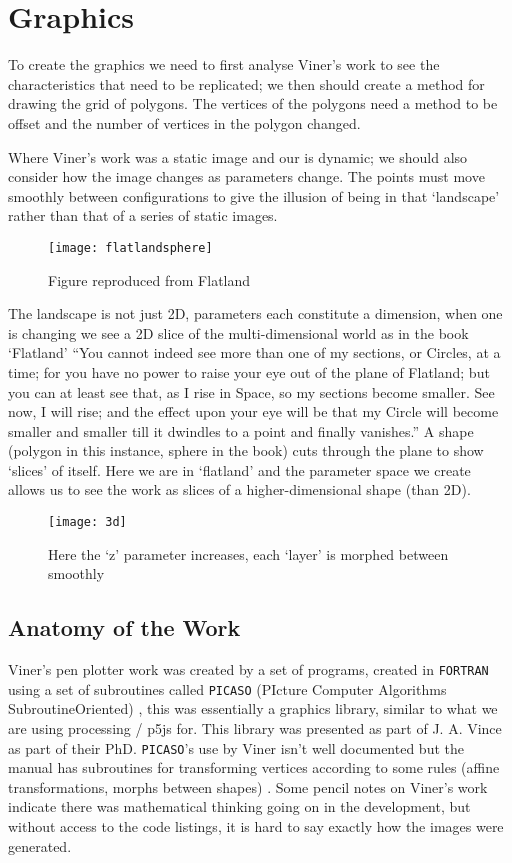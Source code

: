 \chapter{Graphics}
To create the graphics we need to first analyse Viner's work to see the
characteristics that need to be replicated; we then should create a method for
drawing the grid of polygons. The vertices of the polygons need a method to be
offset and the number of vertices in the polygon changed.

Where Viner's work was a static image and our is dynamic; we should also
consider how the image changes as parameters change. The points must move
smoothly between configurations to give the illusion of being in that
`landscape' rather than that of a series of static images.

\begin{figure}[H]
    \centering
    \texttt{[image: flatlandsphere]}
    \caption{Figure reproduced from Flatland \citep[p.112]{abbott1885flatland}}
\end{figure}

The landscape is not just 2D, parameters each constitute a dimension, when one
is changing we see a 2D slice of the multi-dimensional world as in the book
`Flatland' ``You cannot indeed see more than one of my sections, or Circles, at
a time; for you have no power to raise your eye out of the plane of Flatland;
but you can at least see that, as I rise in Space, so my sections become
smaller. See now, I will rise; and the effect upon your eye will be that my
Circle will become smaller and smaller till it dwindles to a point and finally
vanishes.'' \citep[p.112]{abbott1885flatland} A shape (polygon in this instance,
sphere in the book) cuts through the plane to show `slices' of itself. Here we
are in `flatland' and the parameter space we create allows us to see the work as
slices of a higher-dimensional shape (than 2D). 

\begin{figure}[H]
    \centering
    \texttt{[image: 3d]}
    \caption{Here the `z' parameter increases, each `layer' is morphed between
    smoothly}
\end{figure}

\section{Anatomy of the Work}
Viner's pen plotter work was created by a set of programs, created in
\verb|FORTRAN| using a set of subroutines called \verb|PICASO| (PIcture Computer
Algorithms SubroutineOriented) \citep{lycett_2016}, this was essentially a
graphics library, similar to what we are using processing / p5js for. This
library was presented as part of J. A. Vince as part of their PhD.
\verb|PICASO|'s use by Viner isn't well documented but the manual has
subroutines for transforming vertices according to some rules (affine
transformations, morphs between shapes) \citep{picaso_manual}. Some pencil notes
on Viner's work indicate there was mathematical thinking going on in
the development, but without access to the code listings, it is hard to say
exactly how the images were generated.

